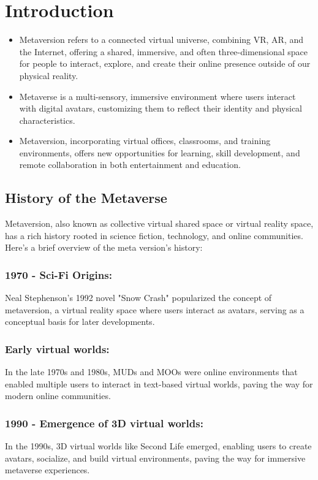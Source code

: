 \chapter{Introduction}
\label{sec:introduction}
\begin{itemize}
\item Metaversion refers to a connected virtual universe, combining VR, AR, and the Internet, offering a shared, immersive, and often three-dimensional space for people to interact, explore, and create their online presence outside of our physical reality.
\item Metaverse is a multi-sensory, immersive environment where users interact with digital avatars, customizing them to reflect their identity and physical characteristics.
\item Metaversion, incorporating virtual offices, classrooms, and training environments, offers new opportunities for learning, skill development, and remote collaboration in both entertainment and education.
\end{itemize}
\section{History of the Metaverse}
Metaversion, also known as collective virtual shared space or virtual reality space, has a rich history rooted in science fiction, technology, and online communities. Here's a brief overview of the meta version's history:
\subsection{1970 - Sci-Fi Origins:}
Neal Stephenson's 1992 novel "Snow Crash" popularized the concept of metaversion, a virtual reality space where users interact as avatars, serving as a conceptual basis for later developments.
\subsection{Early virtual worlds:}
In the late 1970s and 1980s, MUDs and MOOs were online environments that enabled multiple users to interact in text-based virtual worlds, paving the way for modern online communities.
\subsection{1990 - Emergence of 3D virtual worlds:}
In the 1990s, 3D virtual worlds like Second Life emerged, enabling users to create avatars, socialize, and build virtual environments, paving the way for immersive metaverse experiences.
